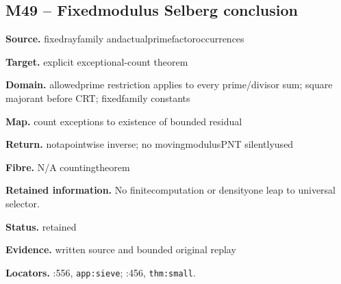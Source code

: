 \subsection*{M49 -- Fixedmodulus Selberg conclusion}
\noindent\textbf{Source.} fixedrayfamily andactualprimefactoroccurrences\par
\noindent\textbf{Target.} explicit exceptional-count theorem\par
\noindent\textbf{Domain.} allowedprime restriction applies to every prime/divisor sum; square majorant before CRT; fixedfamily constants\par
\noindent\textbf{Map.} count exceptions to existence of bounded residual\par
\noindent\textbf{Return.} notapointwise inverse; no movingmodulusPNT silentlyused\par
\noindent\textbf{Fibre.} N/A countingtheorem\par
\noindent\textbf{Retained information.} No finitecomputation or densityone leap to universal selector.\par
\noindent\textbf{Status.} retained\par
\noindent\textbf{Evidence.} written source and bounded original replay\par
\noindent\textbf{Locators.} :556, \texttt{app:sieve}; :456, \texttt{thm:small}.
